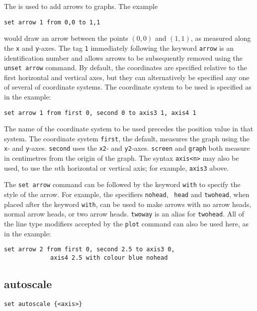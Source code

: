 The  is used to add arrows to graphs. The example

\begin{verbatim}
set arrow 1 from 0,0 to 1,1
\end{verbatim}

\noindent would draw an arrow between the points $(0,0)$ and $(1,1)$, as
measured along the {\tt x} and {\tt y}-axes.  The tag {\tt 1} immediately
following the keyword {\tt arrow} is an identification number and allows arrows
to be subsequently removed using the {\tt unset arrow} command.  By default,
the coordinates are specified relative to the first horizontal and vertical
axes, but they can alternatively be specified any one of several of coordinate
systems. The coordinate system to be used is specified as in the example:

\begin{verbatim}
set arrow 1 from first 0, second 0 to axis3 1, axis4 1
\end{verbatim}

\noindent The name of the coordinate system to be used precedes the position
value in that system. The coordinate system {\tt first}, the default, measures
the graph using the {\tt x}- and {\tt y}-axes. {\tt second} uses the {\tt x2}-
and {\tt y2}-axes.  {\tt screen} and {\tt graph} both measure in centimetres
from the origin of the graph.  The syntax {\tt axis<n>} may also be used, to
use the $n$th horizontal or vertical axis; for example, {\tt axis3} above.

The {\tt set arrow} command can be followed by the keyword {\tt with} to
specify the style of the arrow. For example, the specifiers {\tt nohead}, {\tt
head} and {\tt twohead}, when placed after the keyword {\tt with}, can be used
to make arrows with no arrow heads, normal arrow heads, or two arrow heads.
{\tt twoway} is an alias for {\tt twohead}. All of the line type modifiers
accepted by the {\tt plot} command can also be used here, as in the example:

\begin{verbatim}
set arrow 2 from first 0, second 2.5 to axis3 0,
             axis4 2.5 with colour blue nohead
\end{verbatim}


\subsection{autoscale}

\begin{verbatim}
set autoscale {<axis>}
\end{verbatim}

